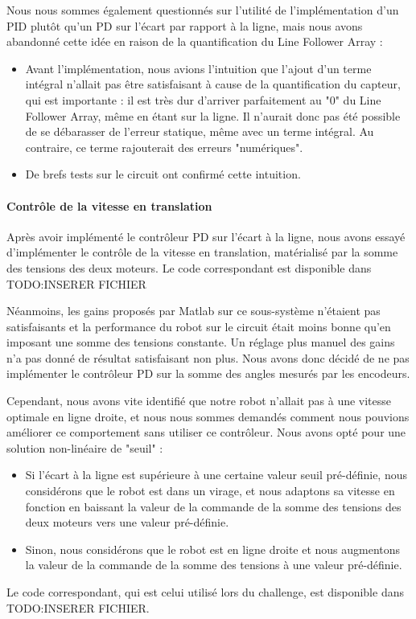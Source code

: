\documentclass{report}
\begin{document}
Nous nous sommes également questionnés sur l'utilité de l'implémentation d'un PID plutôt qu'un PD sur l'écart par rapport à la ligne, mais nous avons abandonné cette idée en raison de la quantification du Line Follower Array :
\begin{itemize}
    \item Avant l'implémentation, nous avions l'intuition que l'ajout d'un terme intégral n'allait pas être satisfaisant à cause de la quantification du capteur, qui est importante : il est très dur d'arriver parfaitement au "0" du Line Follower Array, même en étant sur la ligne. Il n'aurait donc pas été possible de se débarasser de l'erreur statique, même avec un terme intégral. Au contraire, ce terme rajouterait des erreurs "numériques".
    \item De brefs tests sur le circuit ont confirmé cette intuition.
\end{itemize}

\paragraph{Contrôle de la vitesse en translation}
Après avoir implémenté le contrôleur PD sur l'écart à la ligne, nous avons essayé d'implémenter le contrôle de la vitesse en translation, matérialisé par la somme des tensions des deux moteurs. Le code correspondant est disponible dans TODO:INSERER FICHIER

Néanmoins, les gains proposés par Matlab sur ce sous-système n'étaient pas satisfaisants et la performance du robot sur le circuit était moins bonne qu'en imposant une somme des tensions constante. Un réglage plus manuel des gains n'a pas donné de résultat satisfaisant non plus. Nous avons donc décidé de ne pas implémenter le contrôleur PD sur la somme des angles mesurés par les encodeurs.

Cependant, nous avons vite identifié que notre robot n'allait pas à une vitesse optimale en ligne droite, et nous nous sommes demandés comment nous pouvions améliorer ce comportement sans utiliser ce contrôleur. Nous avons opté pour une solution non-linéaire de "seuil" : 
\begin{itemize}
    \item Si l'écart à la ligne est supérieure à une certaine valeur seuil pré-définie, nous considérons que le robot est dans un virage, et nous adaptons sa vitesse en fonction en baissant la valeur de la commande de la somme des tensions des deux moteurs vers une valeur pré-définie.
    \item Sinon, nous considérons que le robot est en ligne droite et nous augmentons la valeur de la commande de la somme des tensions à une valeur pré-définie.
\end{itemize}
Le code correspondant, qui est celui utilisé lors du challenge, est disponible dans TODO:INSERER FICHIER.
\end{document}
